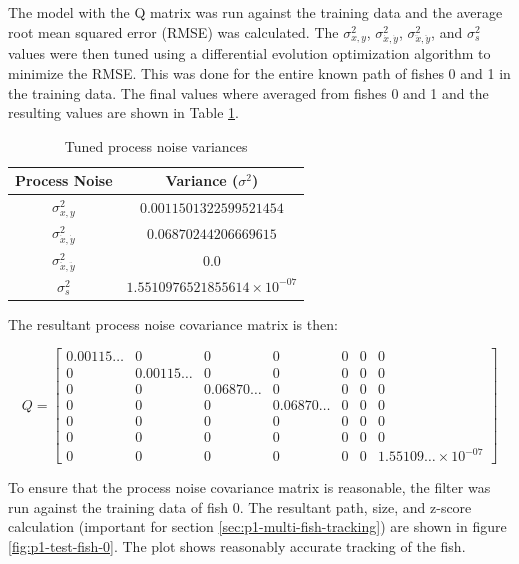 \documentclass[12pt]{article}
\begin{document}
The model with the Q matrix was run against the training data and the average root mean squared error (RMSE) was calculated. The $\sigma^2_{x,y}$, $\sigma^2_{\dot{x},\dot{y}}$, $\sigma^2_{\ddot{x},\ddot{y}}$, and $\sigma^2_{s}$ values were then tuned using a differential evolution optimization algorithm \cite{scipy} to minimize the RMSE. This was done for the entire known path of fishes 0 and 1 in the training data. The final values where averaged from fishes 0 and 1 and the resulting values are shown in Table \ref{tab:p1-tuned-proc-noise}.

\begin{table}[H]
    \centering
    \caption{Tuned process noise variances}
    \label{tab:p1-tuned-proc-noise}
    \begin{tabular}{|c|c|}
        \hline
        \textbf{Process Noise} & \textbf{Variance} ($\sigma^2$) \\
        \hline
        $\sigma^2_{x,y}$ & $0.0011501322599521454$ \\
        \hline
        $\sigma^2_{\dot{x},\dot{y}}$ & $0.06870244206669615$ \\
        \hline
        $\sigma^2_{\ddot{x},\ddot{y}}$ & $0.0$ \\
        \hline
        $\sigma^2_{s}$ & $1.5510976521855614 \times 10^{-07}$ \\
        \hline
    \end{tabular}
\end{table}

The resultant process noise covariance matrix is then:

\begin{equation}
    \label{eqn:p1-tuned-proc-noise-cov}
    Q = \begin{bmatrix}
        0.00115\dots & 0 & 0 & 0 & 0 & 0 & 0 \\
        0 & 0.00115\dots & 0 & 0 & 0 & 0 & 0 \\
        0 & 0 & 0.06870\dots & 0 & 0 & 0 & 0 \\
        0 & 0 & 0 & 0.06870\dots & 0 & 0 & 0 \\
        0 & 0 & 0 & 0 & 0 & 0 & 0 \\
        0 & 0 & 0 & 0 & 0 & 0 & 0 \\
        0 & 0 & 0 & 0 & 0 & 0 & 1.55109\dots \times 10^{-07}
    \end{bmatrix}
\end{equation}

To ensure that the process noise covariance matrix is reasonable, the filter was run against the training data of fish 0. The resultant path, size, and z-score calculation (important for section \ref{sec:p1-multi-fish-tracking}) are shown in figure \ref{fig:p1-test-fish-0}. The plot shows reasonably accurate tracking of the fish.
\end{document}
